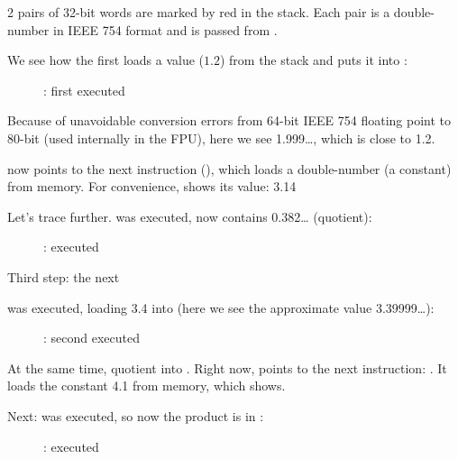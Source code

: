 ﻿\clearpage
{}
\myindex{\olly}

2 pairs of 32-bit words are marked by red in the stack. 
Each pair is a double-number in IEEE 754 format and is passed from \main.

We see how the first \FLD loads a value ($1.2$) from the stack and puts it into :

\begin{figure}[H]
\centering
{}
\caption{\olly: first \FLD executed}
\label{fig:FPU_simple_olly_1}
\end{figure}

Because of unavoidable conversion errors from 64-bit IEEE 754 floating point to 80-bit
(used internally in the FPU), here we see 1.999\ldots, which is close to 1.2.

\EIP now points to the next instruction (\FDIV), which loads a double-number (a constant) from memory.
For convenience, \olly shows its value: 3.14

\clearpage
Let's trace further. 
\FDIV was executed, now  contains 0.382\ldots
(\gls{quotient}):

\begin{figure}[H]
\centering
{}
\caption{\olly: \FDIV executed}
\label{fig:FPU_simple_olly_2}
\end{figure}

\clearpage
Third step: the next \FLD 

was executed, loading 3.4 into  (here we see the approximate value 3.39999\ldots): 

\begin{figure}[H]
\centering
{}
\caption{\olly: second \FLD executed}
\label{fig:FPU_simple_olly_3}
\end{figure}

At the same time, \gls{quotient}  into .
Right now, \EIP points to the next instruction: \FMUL. 
It loads the constant 4.1 from memory, which \olly shows.

\clearpage
Next: \FMUL %
was executed, so now the \gls{product} is in :

\begin{figure}[H]
\centering
{}
\caption{\olly: \FMUL executed}
\label{fig:FPU_simple_olly_4}
\end{figure}

